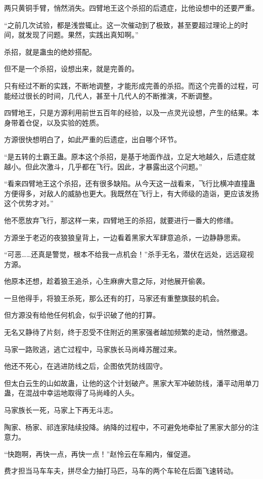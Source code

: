 \begin{this_body}
两只黄铜手臂，悄然消失。四臂地王这个杀招的后遗症，比他设想中的还要严重。

“之前几次试验，都是浅尝辄止。这一次催动到了极致，甚至要超过理论上的时间，就发现了问题。果然，实践出真知啊。”

杀招，就是蛊虫的绝妙搭配。

但不是一个杀招，设想出来，就是完善的。

只有经过不断的实践，不断地调整，才能形成完善的杀招。而这个完善的过程，可能经过很长的时间，几代人，甚至十几代人的不断推演，不断调整。

四臂地王，只是方源利用前世五百年的经验，以及一点灵光设想，产生的结果。本身带着仓促，以及实验的姓质。

方源很快想明白了，如此严重的后遗症，出自哪个环节。

“是五转的土霸王蛊。原本这个杀招，是基于地面作战，立足大地越久，后遗症就越小。但此次激斗，几乎都在飞行。因此，才暴露出这个问题。”

“看来四臂地王这个杀招，还有很多缺陷。从今天这一战看来，飞行比横冲直撞蛊方便得多，对敌人的威胁也更大。我既然在飞行上，有大师级的造诣，更应该发扬这个优势才对。”

他不愿放弃飞行，那这样一来，四臂地王的杀招，就要进行一番大的修缮。

方源坐于老迈的夜狼狼皇背上，一边看着黑家大军肆意追杀，一边静静思索。

“可恶……还真是警觉，根本不给我一点机会！”杀手无名，潜伏在远处，远远窥视方源。

他原本还想，趁着狼王追杀，心生麻痹大意之际，对他展开偷袭。

一旦他得手，将狼王杀死，那么还有的打，马家还有重整旗鼓的机会。

但方源没有给他任何机会，似乎识破了他的打算。

无名又静待了片刻，终于忍受不住附近的黑家强者越加频繁的走动，悄然撤退。

马家一路败逃，逃亡过程中，马家族长马尚峰苏醒过来。

他还不死心，在逃进防线之后，企图依凭防线固守。

但太白云生的山如故蛊，让他的这个计划破产。黑家大军冲破防线，潘平动用单刀蛊，在混战中幸运地取得了马尚峰的人头。

马家族长一死，马家上下再无斗志。

陶家、杨家、祁连家陆续投降。纳降的过程中，不可避免地牵扯了黑家大部分的注意力。

“快跑啊，再快一点，再快一点！”赵怜云在车厢内，催促道。

费才担当马车车夫，拼尽全力抽打马匹，马车的两个车轮在后面飞速转动。


\end{this_body}

